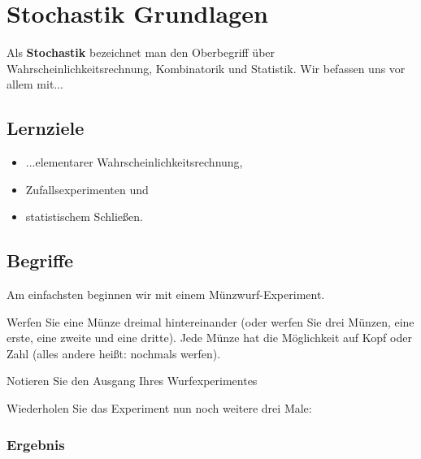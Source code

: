 
\section{Stochastik Grundlagen}

Als \textbf{Stochastik} bezeichnet man den Oberbegriff über
Wahrscheinlichkeitsrechnung, Kombinatorik und Statistik. Wir befassen
uns vor allem mit...

\subsection{Lernziele}
\begin{itemize}
	\item ...elementarer Wahrscheinlichkeitsrechnung,
	\item Zufallsexperimenten und
	\item{statistischem Schließen.}
\end{itemize}


\subsection{Begriffe}
Am einfachsten beginnen wir mit einem Münzwurf-Experiment.

Werfen Sie eine Münze dreimal hintereinander (oder werfen Sie drei
Münzen, eine erste, eine zweite und eine dritte). Jede Münze hat die
Möglichkeit auf Kopf oder Zahl (alles andere heißt: nochmals werfen).

Notieren Sie den Ausgang Ihres Wurfexperimentes


\TRAINER{\vspace{24mm}}

Wiederholen Sie das Experiment nun noch weitere drei Male:



\newpage



\subsubsection{Ergebnis}

